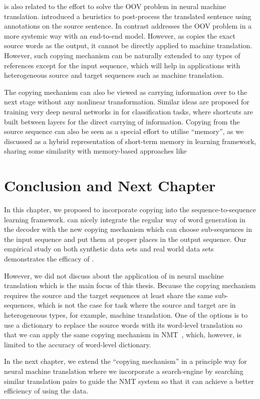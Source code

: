 \copynet is also related to the effort to solve the OOV problem in neural machine translation.  introduced a heuristics to post-process the translated sentence using annotations on the source sentence. In contrast \copynet addresses the OOV problem in a more systemic way with an end-to-end model. However, as \copynet copies the exact source words as the output, it cannot be directly applied to machine translation. However, such copying mechanism can be naturally extended to any types of references except for the input sequence, which will help in applications with heterogeneous source and target sequences such as machine translation.

The copying mechanism can also be viewed as carrying information over to the next stage without any nonlinear transformation.  Similar ideas are proposed for training very deep neural networks in \cite{srivastava2015highway,he2015deep} for classification tasks, where shortcuts are built between layers for the direct carrying of information.  Copying from the source sequence can also be seen as a special effort to utilise ``memory'', as we discussed as a hybrid representation of short-term memory in \sts learning framework, sharing some similarity with memory-based approaches like \cite{weston2014memory,sukhbaatar2015end,graves2014neural}



\section{Conclusion and Next Chapter}
In this chapter, we proposed \copynet to incorporate copying into the sequence-to-sequence learning framework.  \copynet can nicely integrate the regular way of word generation in the decoder with the new copying mechanism which can choose sub-sequences in the input sequence and put them at proper places in the output sequence. Our empirical study on both synthetic data sets and real world data sets demonstrates the efficacy of \copynet. 

However, we did not discuss about the application of \copynet in neural machine translation which is the main focus of this thesis. Because the copying mechanism requires the source and the target sequences at least share the same sub-sequences, which is not the case for  task where the source and target are in  heterogeneous types, for example, machine translation. One of the options is to use a dictionary to replace the source words with its word-level translation so that we can apply the same copying mechanism in NMT~\cite{gulcehre2016pointing}, which, however, is limited to the accuracy of word-level dictionary. 

In the next chapter, we extend the ``copying mechanism'' in a principle way for neural machine translation where we incorporate a search-engine by searching similar translation pairs to guide the NMT system so that it can achieve a better efficiency of using the data.